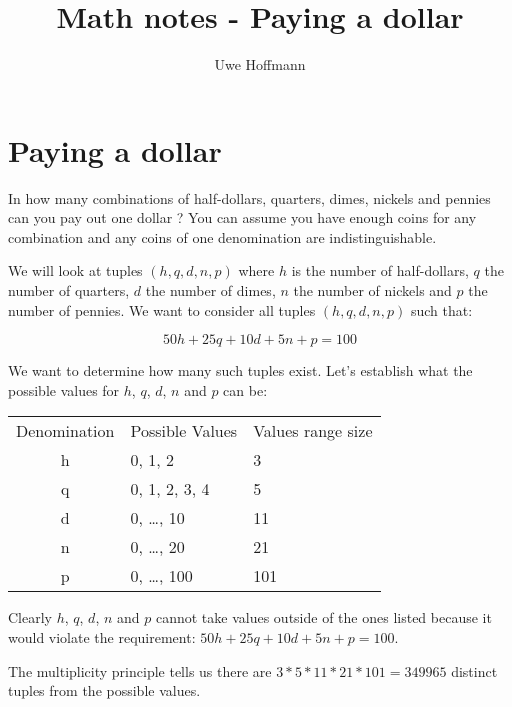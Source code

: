 

\title{Math notes - Paying a dollar}
\author{Uwe Hoffmann}



\setcounter{chapter}{1}
\section*{Paying a dollar}

\vspace{10 mm}
\begin{problem}
In how many combinations of half-dollars, quarters, dimes, nickels and pennies  can you pay out one dollar ? You can assume you have enough coins for any combination and any coins of one denomination are indistinguishable.
\end{problem}

We will look at tuples $(h, q, d, n, p)$ where $h$ is the number of half-dollars, $q$ the number of quarters, $d$ the number of dimes, $n$ the number of nickels and $p$ the number of pennies. We want to consider all tuples $(h, q, d, n, p)$ such that:

\begin{equation*}
50 h + 25 q + 10 d + 5 n + p = 100
\end{equation*} 

We want to determine how many such tuples exist. Let's establish what the possible values for $h$, $q$, $d$, $n$ and $p$ can be:

\begin{center}
  \begin{tabular}{cll}
       Denomination & Possible Values & Values range size\\[5pt]
       h & 0, 1, 2 & 3\\
       q & 0, 1, 2, 3, 4 & 5\\
       d & 0, \ldots, 10 & 11\\
       n & 0, \ldots, 20 & 21\\
       p & 0, \ldots, 100 & 101
    \end{tabular}
\end{center}    

Clearly $h$, $q$, $d$, $n$ and $p$ cannot take values outside of the ones listed because it would violate the requirement: $50 h + 25 q + 10 d + 5 n + p = 100$.

The multiplicity principle tells us there are $3 * 5 * 11 * 21 * 101 =  349965$ distinct tuples from the possible values.

